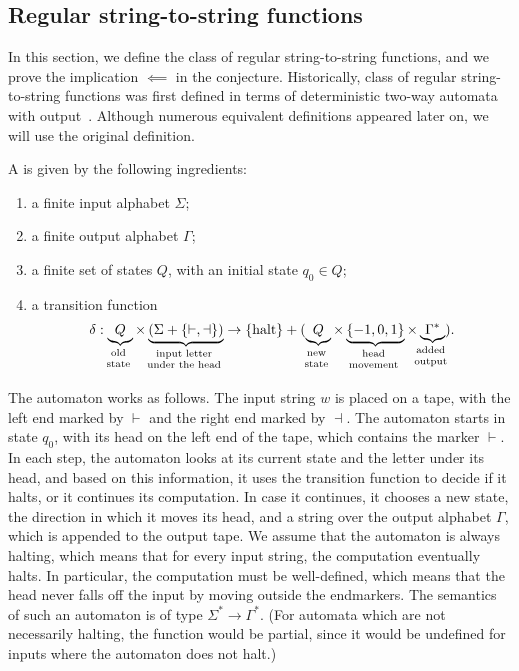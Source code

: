 
\subsection{Regular string-to-string functions}
\label{sec:regular-string-to-string-functions}

In this section, we define the class of regular string-to-string functions, and
we prove the implication $\impliedby$ in the conjecture. Historically, class of
regular string-to-string  functions was first defined in terms of deterministic
two-way automata with output~\cite[Note 4]{shepherdson1959reduction}. Although
numerous equivalent definitions appeared later on, we will use the original
definition.

 \begin{definition}
   A  is given by the following ingredients:
    \begin{enumerate}
        \item a finite input alphabet $\Sigma$;
        \item a finite output alphabet $\Gamma$;
        \item a finite set of states $Q$, with an initial state $q_0 \in Q$;
        \item a transition function  
        \begin{align*}
        \delta : 
        \myunderbrace{Q}{old \\ state} \times 
        \myunderbrace{(\Sigma + \{\vdash, \dashv\})}{input letter\\ under  the head} \to  \set{\text{halt}} + (
        \myunderbrace{Q}{new \\ state}
         \times 
         \myunderbrace{\{-1,0,1\}}{head \\ movement} \times 
         \myunderbrace{\Gamma^*}{added \\ output}) .
        \end{align*}
    \end{enumerate}
 \end{definition}

The automaton works as follows. The input string $w$ is placed on a tape,
with the left end marked by $\vdash$ and the right end marked by $\dashv$.
The automaton starts in state $q_0$, with its head on the left end of the
tape, which contains the marker $\vdash$. In each step, the automaton looks
at its current state and the letter under its head, and based on this
information, it uses the transition function to decide if it halts, or it
continues its computation. In case it continues, it chooses a  new state,
the direction in which it moves its head, and a string over the output
alphabet $\Gamma$, which is appended to the output tape. We assume that the
automaton is always halting, which means that for every input string, the
computation eventually halts. In particular, the computation must be
well-defined, which means that the head never falls off the input by moving
outside the endmarkers.   The semantics of such an automaton is of type
$\Sigma^* \to \Gamma^*$. (For automata which are not necessarily halting,
the function would be partial, since it would be undefined for inputs where
the automaton does not halt.)

